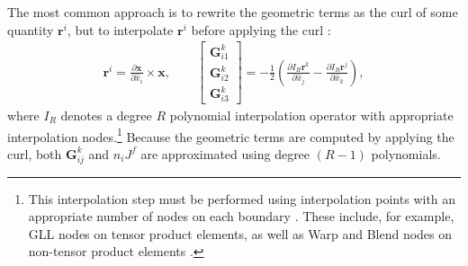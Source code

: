 \documentclass[preprint,10pt]{elsarticle}
\theoremstyle{definition}
\theoremstyle{lemma}
\theoremstyle{corollary}
\theoremstyle{theorem}
\theoremstyle{assumption}
\renewcommand{\hat}[1]{\widehat{#1}}
\newcommand{\pd}[2]{\frac{\partial#1}{\partial#2}}
\newcommand{\LRp}[1]{\left( #1 \right)}
\newcommand{\LRs}[1]{\left[ #1 \right]}
\begin{document}
The most common approach is to rewrite the geometric terms as the curl of some quantity $\bm{r}^i$, but to interpolate $\bm{r}^i$ before applying the curl \cite{visbal2002use, kopriva2006metric, hindenlang2012explicit}:
\begin{align}
\bm{r}^i = { \pd{\bm{x}}{\hat{x}_i}\times \bm{x}}, \qquad
\LRs{\begin{array}{c}
\bm{G}^k_{i1}\\
\bm{G}^k_{i2}\\
\bm{G}^k_{i3}\end{array}} = -\frac{1}{2}\LRp{\pd{I_{R}\bm{r}^k}{\hat{x}_j}-\pd{I_{R}\bm{r}^j}{\hat{x}_k}}, 
\label{eq:iconscurl}
\end{align}
where $I_{R}$ denotes a degree ${R}$ polynomial interpolation operator with appropriate interpolation nodes.\footnote{This interpolation step must be performed using interpolation points with an appropriate number of nodes on each boundary \cite{chan2018discretely}.  These include, for example, GLL nodes on tensor product elements, as well as Warp and Blend nodes on non-tensor product elements \cite{warburton2006explicit, chan2015comparison}.}  Because the geometric terms are computed by applying the curl, both $\bm{G}^k_{ij}$ and $n_iJ^f$ are approximated using degree $(R-1)$ polynomials.  
\end{document}

